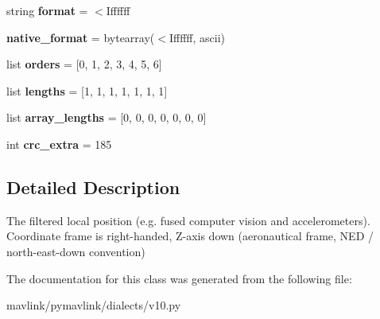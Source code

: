 \begin{DoxyCompactItemize}
string {\bfseries format} = \textquotesingle{}$<$Iffffff\textquotesingle{}
\item 
\mbox{\label{classpymavlink_1_1dialects_1_1v10_1_1MAVLink__local__position__ned__message_a0795acfe8df9b5fcca4a9fd8ccc92cc0}} 
{\bfseries native\+\_\+format} = bytearray(\textquotesingle{}$<$Iffffff\textquotesingle{}, \textquotesingle{}ascii\textquotesingle{})
\item 
\mbox{\label{classpymavlink_1_1dialects_1_1v10_1_1MAVLink__local__position__ned__message_a99d07045575a3b1d201f2ef7a5881184}} 
list {\bfseries orders} = \mbox{[}0, 1, 2, 3, 4, 5, 6\mbox{]}
\item 
\mbox{\label{classpymavlink_1_1dialects_1_1v10_1_1MAVLink__local__position__ned__message_a2c432948467c12dcef5ba3d66f45e4b3}} 
list {\bfseries lengths} = \mbox{[}1, 1, 1, 1, 1, 1, 1\mbox{]}
\item 
\mbox{\label{classpymavlink_1_1dialects_1_1v10_1_1MAVLink__local__position__ned__message_ac73b5861376679d2a3bfd11a54689459}} 
list {\bfseries array\+\_\+lengths} = \mbox{[}0, 0, 0, 0, 0, 0, 0\mbox{]}
\item 
\mbox{\label{classpymavlink_1_1dialects_1_1v10_1_1MAVLink__local__position__ned__message_abdb07dac3fc1811cd2c3668542a5aac0}} 
int {\bfseries crc\+\_\+extra} = 185
\end{DoxyCompactItemize}


\subsection{Detailed Description}
\begin{DoxyVerb}The filtered local position (e.g. fused computer vision and
accelerometers). Coordinate frame is right-handed, Z-axis down
(aeronautical frame, NED / north-east-down convention)
\end{DoxyVerb}
 

The documentation for this class was generated from the following file\+:\begin{DoxyCompactItemize}
\item 
mavlink/pymavlink/dialects/v10.\+py\end{DoxyCompactItemize}
